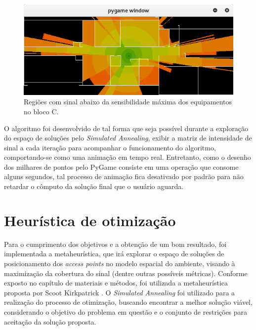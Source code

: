 \documentclass[
	12pt,				%
	twoside,			%
	a4paper,			%
	english,			%
	french,				%
	spanish,			%
	brazil				%
	]{abntex2}
\begin{document}
\begin{figure}[ht]
    \caption{\label{simulacao_sensibilidade} Regiões com sinal abaixo da sensibilidade máxima dos equipamentos no bloco C.}
    \begin{center}
        \includegraphics[scale=0.7]{imagens/sumulacao-sensibilidade.jpg}
    \end{center}
\end{figure}

O algoritmo foi desenvolvido de tal forma que seja possível durante a
exploração do espaço de soluções pelo \emph{Simulated Annealing}, exibir
a matriz de intensidade de sinal a cada iteração para acompanhar o
funcionamento do algoritmo, comportando-se como uma animação em tempo
real. Entretanto, como o desenho dos milhares de pontos pelo PyGame
consiste em uma operação que consome alguns segundos, tal processo de
animação fica desativado por padrão para não retardar o cômputo da
solução final que o usuário aguarda.

\section{Heurística de
otimização}\label{heuruxedstica-de-otimizauxe7uxe3o}

Para o cumprimento dos objetivos e a obtenção de um bom resultado, foi
implementada a metaheurística, que irá explorar o espaço de soluções de
posicionamento dos \emph{access points} no modelo espacial do ambiente,
visando à maximização da cobertura do sinal (dentre outras possíveis
métricas). Conforme exposto no capítulo de materiais e métodos, foi
utilizada a metaheurística proposta por Scoot Kirkpatrick
\cite{PATRICK}. O \emph{Simulated Annealing} foi utilizado para a
realização do processo de otimização, buscando encontrar a melhor
solução viável, considerando o objetivo do problema em questão e o
conjunto de restrições para aceitação da solução proposta.
\end{document}
